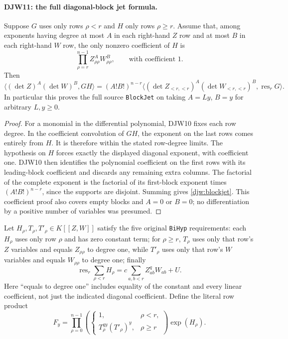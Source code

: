 \paragraph{DJW11: the full diagonal-block jet formula.}
\label{claim:DJW11}
Suppose $G$ uses only rows $\rho<r$ and $H$ only rows $\rho\ge r$.
Assume that, among exponents having degree at most $A$ in each
right-hand $Z$ row and at most $B$ in each right-hand $W$ row,
the only nonzero coefficient of $H$ is
\[
 \prod_{\rho=r}^{n-1}Z_{\rho\rho}^{A}W_{\rho\rho}^{B},
 \qquad\text{with coefficient }1.
\]
Then
\begin{equation}
 \langle(\det Z)^A(\det W)^B,GH\rangle
  =(A!B!)^{n-r}
    \langle(\det Z_{<r,<r})^A(\det W_{<r,<r})^B,
                \operatorname{res}_rG\rangle.
 \label{djw:blockjet}
\end{equation}
In particular this proves the full source \texttt{BlockJet} on taking
$A=Ly$, $B=y$ for arbitrary $L,y\ge0$.

\begin{proof}
For a monomial in the differential polynomial, DJW10 fixes each
row degree.  In the coefficient convolution of $GH$, the exponent
on the last rows comes entirely from $H$.  It is therefore within
the stated row-degree limits.  The hypothesis on $H$ forces exactly
the displayed diagonal exponent, with coefficient one.
DJW10 then identifies the polynomial coefficient on the first rows
with its leading-block coefficient and discards any remaining extra
columns.  The factorial of the complete exponent is the factorial
of its first-block exponent times $(A!B!)^{n-r}$, since the supports
are disjoint.  Summing gives \eqref{djw:blockjet}.
This coefficient proof also covers empty blocks and $A=0$ or $B=0$;
no differentiation by a positive number of variables was presumed.
\end{proof}

Let $H_\rho,T_\rho,T'_\rho\in K[[Z,W]]$ satisfy the five
original \texttt{BiHyp} requirements:
each $H_\rho$ uses only row $\rho$ and has zero constant term;
for $\rho\ge r$, $T_\rho$ uses only that row's $Z$ variables
and equals $Z_{\rho\rho}$ to degree one, while $T'_\rho$
uses only that row's $W$ variables and equals $W_{\rho\rho}$
to degree one; finally
\begin{equation}
 \operatorname{res}_r\sum_{\rho<r}H_\rho
       =c\sum_{a,b<r}Z_{ab}^{q}W_{ab}+U.
 \label{djw:biR3}
\end{equation}
Here ``equals to degree one'' includes equality of the constant
and every linear coefficient, not just the indicated diagonal
coefficient.  Define the literal row product
\[
 F_y=\prod_{\rho=0}^{n-1}
       \left(\begin{cases}1,&\rho<r,\\
           T_\rho^{qy}(T'_\rho)^y,&\rho\ge r
       \end{cases}\right)\exp(H_\rho).
\]

